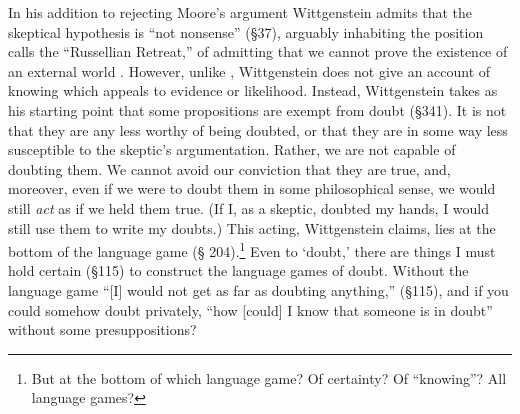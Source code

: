 \documentclass[man,12pt,natbib]{apa6}
\begin{document}
In his addition to rejecting Moore's argument Wittgenstein admits that the
skeptical hypothesis is ``not nonsense'' (\S 37),
arguably inhabiting the position \citet{Wright91} calls the ``Russellian
Retreat,'' of admitting that we cannot prove the existence of an external world
\citep{Robinson}.  However, unlike \citet{Russell12}, Wittgenstein does not
give an account of knowing which appeals to evidence or likelihood.  Instead,
Wittgenstein takes as his starting point that some propositions are exempt from
doubt (\S 341). It is not that they are any less worthy of being doubted, or
that they are in some way less susceptible to the skeptic's argumentation.
Rather, we are not capable of doubting them.
We cannot avoid our conviction that they are true,
and, moreover, even if we were to doubt them in some philosophical sense, we
would still \emph{act} as if we held them true.  (If I, as a skeptic, doubted
my hands, I would still use them to write my doubts.)
This acting, Wittgenstein claims, lies at the bottom of the language game (\S
204).\footnote{But at the bottom of which language game? Of certainty?  Of
``knowing''? All language games?} Even to `doubt,' there are things I must hold
certain (\S 115) to construct the language games of doubt. Without the language
game ``[I] would not get as far as doubting anything,'' (\S 115), and if you
could somehow doubt privately, ``how [could] I know that someone is in doubt''
without some presuppositions?
\end{document}
